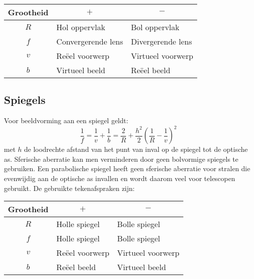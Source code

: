 \begin{center}
\begin{tabular}{||c|l|l||}
\hline
{\bf Grootheid}&\multicolumn{1}{c|}{\boldmath$+$}&\multicolumn{1}{c||}{\boldmath$-$}\\
\hline
\hline
$R$&Hol oppervlak&Bol oppervlak\\
$f$&Convergerende lens&Divergerende lens\\
$v$&Re\"eel voorwerp&Virtueel voorwerp\\
$b$&Virtueel beeld&Re\"eel beeld\\
\hline
\end{tabular}
\end{center}

\subsection{Spiegels}
Voor beeldvorming aan een spiegel geldt:
\[
\frac{1}{f}=\frac{1}{v}+\frac{1}{b}=\frac{2}{R}+\frac{h^2}{2}\left(\frac{1}{R}-\frac{1}{v}\right)^2
\]
met $h$ de loodrechte afstand van het punt van inval op de spiegel tot de
optische as. Sferische aberratie kan men verminderen door geen bolvormige
spiegels te gebruiken. Een parabolische spiegel heeft geen sferische aberratie
voor stralen die evenwijdig aan de optische as invallen en wordt daarom veel
voor telescopen gebruikt. De gebruikte tekenafspraken zijn:

\begin{center}
\begin{tabular}{||c|l|l||}
\hline
{\bf Grootheid}&\multicolumn{1}{c|}{\boldmath$+$}&\multicolumn{1}{c||}{\boldmath$-$}\\
\hline
\hline
$R$&Holle spiegel&Bolle spiegel\\
$f$&Holle spiegel&Bolle spiegel\\
$v$&Re\"eel voorwerp&Virtueel voorwerp\\
$b$&Re\"eel beeld&Virtueel beeld\\
\hline
\end{tabular}
\end{center}

